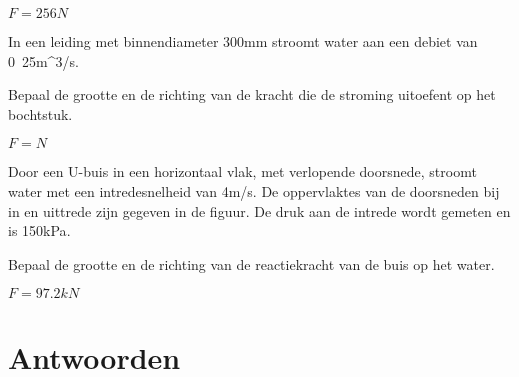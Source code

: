 	\begin{antwoord}
		$F = \unit{256}{N}$
	\end{antwoord}
	\begin{toepassing}
		\label{45gradenbocht}
In een leiding met binnendiameter 300mm stroomt water aan een debiet van \unit{0.25}{m^3/s}.    

Bepaal de grootte en de richting van de kracht die de stroming uitoefent op het bochtstuk.
		\begin{center}
			
		\end{center}
	\end{toepassing}
	\begin{antwoord}
		$F = \unit{}{N}$
	\end{antwoord}
	\begin{toepassing}
		\label{diffusiebocht}
Door een U-buis in een horizontaal vlak, met verlopende doorsnede, stroomt water met een intredesnelheid van \unit{4}{m/s}. De oppervlaktes van de doorsneden bij in en uittrede zijn gegeven in de figuur. De druk aan de intrede wordt gemeten en is \unit{150}{kPa}.
		
Bepaal de grootte en de richting van de reactiekracht van de buis op het water.
		\begin{center}
			
		\end{center}
	\end{toepassing}
	\begin{antwoord}
		$F = \unit{97.2}{kN}$
	\end{antwoord}
	
	\section*{Antwoorden}
	\begin{multicols}{2}
	\end{multicols}